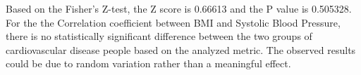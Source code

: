 \documentclass[
  letterpaper,
  DIV=11,
  numbers=noendperiod]{scrartcl}
\begin{document}
Based on the Fisher's Z-test, the Z score is 0.66613 and the P value is
0.505328. For the the Correlation coefficient between BMI and Systolic
Blood Pressure, there is no statistically significant difference between
the two groups of cardiovascular disease people based on the analyzed
metric. The observed results could be due to random variation rather
than a meaningful effect.
\end{document}
